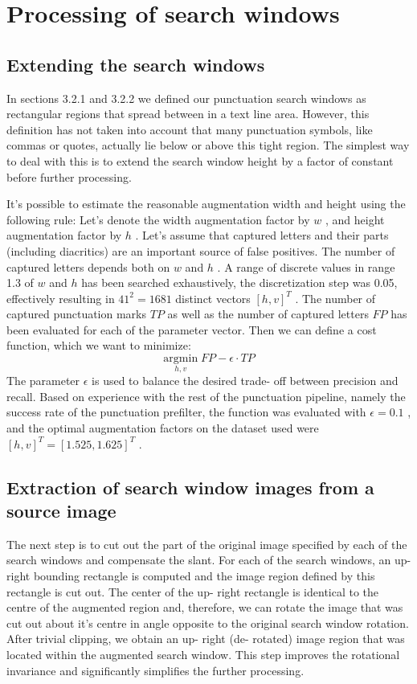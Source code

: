 \documentclass[12pt,a4paper]{report}
\begin{document}
\section{Processing of search windows}
\subsection{Extending the search windows}
In sections 3.2.1 and 3.2.2 we defined our punctuation search windows as rectangular regions that spread between in a text line area. However, this definition has not taken into account that many punctuation symbols, like commas or quotes, actually lie below or above this tight region. The simplest way to deal with this is to extend the search window height by a factor of constant before further processing.

It's possible to estimate the reasonable augmentation width and height using the following rule: Let's denote the width augmentation factor by $w$ , and height augmentation factor by $h$ . Let's assume that captured letters and their parts (including diacritics) are an important source of false positives. The number of captured letters depends both on $w$ and $h$ . A range of discrete values in range 1.3 of $w$ and $h$ has been searched exhaustively, the discretization step was 0.05, effectively resulting in $41^2 = 1681$ distinct vectors $[h,v]^T$ . The number of captured punctuation marks $TP$ as well as the number of captured letters $FP$ has been evaluated for each of the parameter vector. Then we can define a cost function, which we want to minimize:
\[
\underset {h,v}{\mathrm{argmin}}\; FP - \epsilon \cdot TP
\]
The parameter $\epsilon$ is used to balance the desired trade- off between precision and recall. Based on experience with the rest of the punctuation pipeline, namely the success rate of the punctuation prefilter, the function was evaluated with $\epsilon = 0.1$ , and the optimal augmentation factors on the dataset used were $[h,v]^T = [1.525,1.625]^T$ .

\subsection{Extraction of search window images from a source image}
The next step is to cut out the part of the original image specified by each of the search windows and compensate the slant. For each of the search windows, an up- right bounding rectangle is computed and the image region defined by this rectangle is cut out. The center of the up- right rectangle is identical to the centre of the augmented region and, therefore, we can rotate the image that was cut out about it's centre in angle opposite to the original search window rotation. After trivial clipping, we obtain an up- right (de- rotated) image region that was located within the augmented search window. This step improves the rotational invariance and significantly simplifies the further processing.
\end{document}
